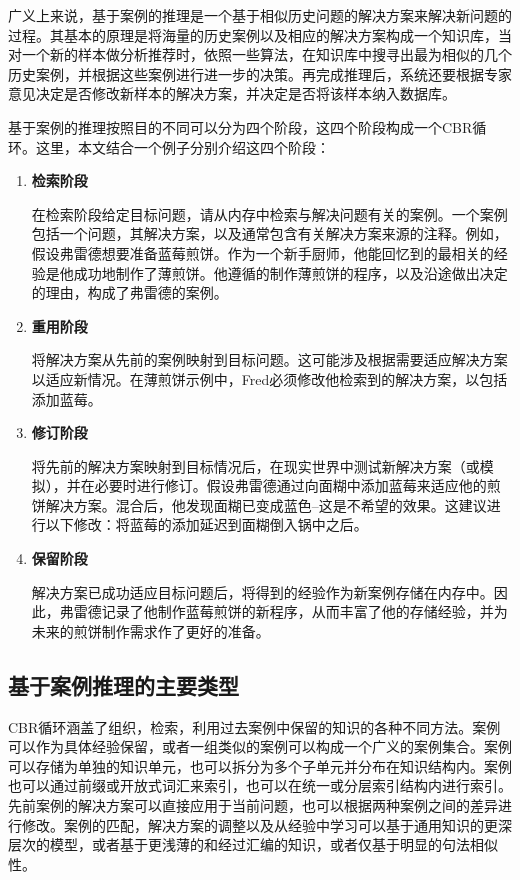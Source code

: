 广义上来说，基于案例的推理是一个基于相似历史问题的解决方案来解决新问题的过程。其基本的原理是将海量的历史案例以及相应的解决方案构成一个知识库，当对一个新的样本做分析推荐时，依照一些算法，在知识库中搜寻出最为相似的几个历史案例，并根据这些案例进行进一步的决策。再完成推理后，系统还要根据专家意见决定是否修改新样本的解决方案，并决定是否将该样本纳入数据库。

基于案例的推理按照目的不同可以分为四个阶段，这四个阶段构成一个CBR循环\cite{Aamodt2001Case}。这里，本文结合一个例子分别介绍这四个阶段：

\begin{enumerate}
  \item \textbf{检索阶段}
  
  在检索阶段给定目标问题，请从内存中检索与解决问题有关的案例。一个案例包括一个问题，其解决方案，以及通常包含有关解决方案来源的注释。例如，假设弗雷德想要准备蓝莓煎饼。作为一个新手厨师，他能回忆到的最相关的经验是他成功地制作了薄煎饼。他遵循的制作薄煎饼的程序，以及沿途做出决定的理由，构成了弗雷德的案例。
  \item \textbf{重用阶段}
  
  将解决方案从先前的案例映射到目标问题。这可能涉及根据需要适应解决方案以适应新情况。在薄煎饼示例中，Fred必须修改他检索到的解决方案，以包括添加蓝莓。
  \item \textbf{修订阶段}
  
  将先前的解决方案映射到目标情况后，在现实世界中测试新解决方案（或模拟），并在必要时进行修订。假设弗雷德通过向面糊中添加蓝莓来适应他的煎饼解决方案。混合后，他发现面糊已变成蓝色–这是不希望的效果。这建议进行以下修改：将蓝莓的添加延迟到面糊倒入锅中之后。
  \item \textbf{保留阶段}
  
  解决方案已成功适应目标问题后，将得到的经验作为新案例存储在内存中。因此，弗雷德记录了他制作蓝莓煎饼的新程序，从而丰富了他的存储经验，并为未来的煎饼制作需求作了更好的准备。
\end{enumerate}



\subsection{基于案例推理的主要类型}

CBR循环涵盖了组织，检索，利用过去案例中保留的知识的各种不同方法。案例可以作为具体经验保留，或者一组类似的案例可以构成一个广义的案例集合。案例可以存储为单独的知识单元，也可以拆分为多个子单元并分布在知识结构内。案例也可以通过前缀或开放式词汇来索引，也可以在统一或分层索引结构内进行索引。先前案例的解决方案可以直接应用于当前问题，也可以根据两种案例之间的差异进行修改。案例的匹配，解决方案的调整以及从经验中学习可以基于通用知识的更深层次的模型，或者基于更浅薄的和经过汇编的知识，或者仅基于明显的句法相似性。

